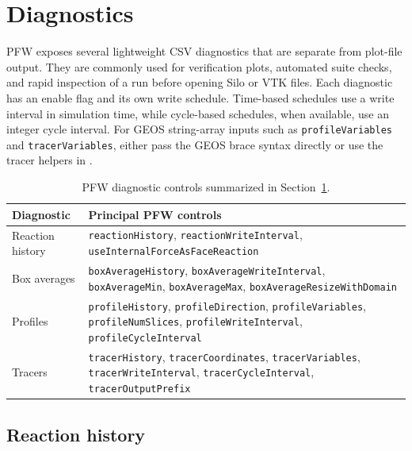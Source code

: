 \section{Diagnostics}
\label{sec:pfw-diagnostics}

PFW exposes several lightweight CSV diagnostics that are separate from plot-file output.  They are commonly used for verification plots, automated suite checks, and rapid inspection of a run before opening Silo or VTK files.  Each diagnostic has an enable flag and its own write schedule.  Time-based schedules use a write interval in simulation time, while cycle-based schedules, when available, use an integer cycle interval.  For GEOS string-array inputs such as \texttt{profileVariables} and \texttt{tracerVariables}, either pass the GEOS brace syntax directly or use the tracer helpers in .

\begin{table}[htbp]
\centering
\small
\begin{tabularx}{\linewidth}{@{}lX@{}}
\toprule
Diagnostic & Principal PFW controls \\
\midrule
Reaction history & \texttt{reactionHistory}, \texttt{reactionWriteInterval}, \texttt{useInternalForceAsFaceReaction} \\
Box averages & \texttt{boxAverageHistory}, \texttt{boxAverageWriteInterval}, \texttt{boxAverageMin}, \texttt{boxAverageMax}, \texttt{boxAverageResizeWithDomain} \\
Profiles & \texttt{profileHistory}, \texttt{profileDirection}, \texttt{profileVariables}, \texttt{profileNumSlices}, \texttt{profileWriteInterval}, \texttt{profileCycleInterval} \\
Tracers & \texttt{tracerHistory}, \texttt{tracerCoordinates}, \texttt{tracerVariables}, \texttt{tracerWriteInterval}, \texttt{tracerCycleInterval}, \texttt{tracerOutputPrefix} \\
\bottomrule
\end{tabularx}
\caption{PFW diagnostic controls summarized in Section~\ref{sec:pfw-diagnostics}.}
\label{tab:pfw-diagnostics-controls}
\end{table}

\subsection{Reaction history}
\label{subsec:pfw-reaction-history}

